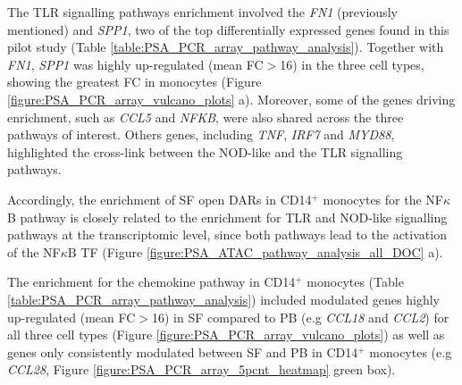 The TLR signalling pathways enrichment involved the \textit{FN1} (previously mentioned) and \textit{SPP1}, two of the top differentially expressed genes found in this pilot study (Table \ref{table:PSA_PCR_array_pathway_analysis}). Together with \textit{FN1}, \textit{SPP1} was highly up-regulated (mean FC$>$16) in the three cell types, showing the greatest FC in monocytes (Figure \ref{figure:PSA_PCR_array_vulcano_plots} a). Moreover, some of the genes driving enrichment, such as \textit{CCL5} and \textit{NFKB}, were also shared across the three pathways of interest. Others genes, including \textit{TNF}, \textit{IRF7} and \textit{MYD88}, highlighted the cross-link between the NOD-like and the TLR signalling pathways. 

Accordingly, the enrichment of SF open DARs in CD14$^+$ monocytes for the NF$\kappa$B pathway is closely related to the enrichment for TLR and NOD-like signalling pathways at the transcriptomic level, since both pathways lead to the activation of the NF$\kappa$B TF  (Figure \ref{figure:PSA_ATAC_pathway_analysis_all_DOC} a). %

The enrichment for the chemokine pathway in CD14$^+$ monocytes (Table \ref{table:PSA_PCR_array_pathway_analysis}) included modulated genes highly up-regulated (mean FC$>$16) in SF compared to PB (e.g \textit{CCL18} and \textit{CCL2}) for all three cell types (Figure \ref{figure:PSA_PCR_array_vulcano_plots}) as well as genes only consistently modulated between SF and PB in CD14$^+$ monocytes (e.g \textit{CCL28}, Figure \ref{figure:PSA_PCR_array_5pcnt_heatmap} green box). %

